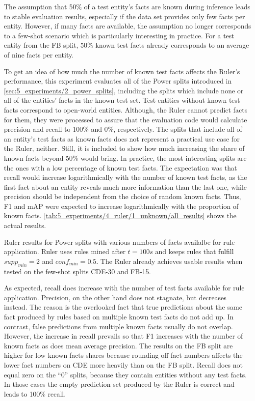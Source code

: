 The assumption that 50\% of a test entity's facts are known during inference leads to stable evaluation results, especially if the data set provides only few facts per entity. However, if many facts are available, the assumption no longer corresponds to a few-shot scenario which is particularly interesting in practice. For a test entity from the FB split, 50\% known test facts already corresponds to an average of nine facts per entity.

To get an idea of how much the number of known test facts affects the Ruler's performance, this experiment evaluates all of the Power splits introduced in \autoref{sec:5_experiments/2_power_splits}, including the splits which include none or all of the entities' facts in the known test set. Test entities without known test facts correspond to open-world entities. Although, the Ruler cannot predict facts for them, they were processed to assure that the evaluation code would calculate precision and recall to 100\% and 0\%, respectively. The splits that include all of an entity's test facts as known facts does not represent a practical use case for the Ruler, neither. Still, it is included to show how much increasing the share of known facts beyond 50\% would bring. In practice, the most interesting splits are the ones with a low percentage of known test facts. The expectation was that recall would increase logarithmically with the number of known test facts, as the first fact about an entity reveals much more information than the last one, while precision should be independent from the choice of random known facts. Thus, F1 and mAP were expected to increase logarithmically with the proportion of known facts. \autoref{tab:5_experiments/4_ruler/1_unknown/all_results} shows the actual results.

\begin{table}
    \centering
    
    \caption{Ruler results for Power splits with various numbers of facts availalbe for rule application. Ruler uses rules mined after $t = 100s$ and keeps rules that fulfill $supp_{min} = 2$ and $conf_{min} = 0.5$. The Ruler already achieves usable results when tested on the few-shot splits CDE-30 and FB-15.}
    \label{tab:5_experiments/4_ruler/1_unknown/all_results}
\end{table}

As expected, recall does increase with the number of test facts available for rule application. Precision, on the other hand does not stagnate, but decreases instead. The reason is the overlooked fact that true predictions about the same fact produced by rules based on multiple known test facts do not add up. In contrast, false predictions from multiple known facts usually do not overlap. However, the increase in recall prevails so that F1 increases with the number of known facts as does mean average precision. The results on the FB split are higher for low known facts shares because rounding off fact numbers affects the lower fact numbers on CDE more heavily than on the FB split. Recall does not equal zero on the ``0'' splits, because they contain entities without any test facts. In those cases the empty prediction set produced by the Ruler is correct and leads to 100\% recall.
